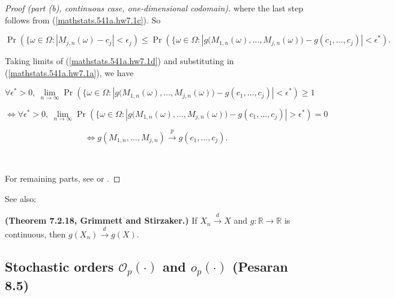 \begin{proof}[Proof (part (b), continuous case, one-dimensional codomain)]
where the last step follows from (\ref{mathstats.541a.hw7.1c}). So

\begin{equation}\label{mathstats.541a.hw7.1d}
\Pr(\{\omega \in \Omega : |M_{j,n}(\omega) - c_j| < \epsilon_j)  \leq \Pr(\{\omega \in \Omega : |g\big(M_{1,n}(\omega),\ldots,M_{j,n}(\omega) \big)- g(c_1, \ldots, c_j)| < \epsilon^*).
\end{equation}

Taking limits of (\ref{mathstats.541a.hw7.1d}) and substituting in (\ref{mathstats.541a.hw7.1a}), we have

%
%
%
%

\[
\forall \epsilon^* > 0, \ \lim_{n \to \infty} \Pr(\{\omega \in \Omega : |g\big(M_{1,n}(\omega),\ldots,M_{j,n}(\omega) \big)- g(c_1, \ldots, c_j)| < \epsilon^*) \geq 1
\]

\[
\iff \forall \epsilon^* > 0, \ \lim_{n \to \infty} \Pr(\{\omega \in \Omega : |g\big(M_{1,n}(\omega),\ldots,M_{j,n}(\omega) \big)- g(c_1, \ldots, c_j)| > \epsilon^*) = 0
\]

\[
\iff g(M_{1,n},\ldots,M_{j,n}) \xrightarrow{p} g(c_{1},\ldots,c_{j}).
\]


\

For remaining parts, see \citet{serfling1980} or \citet{rao1973linear}.\end{proof}

See also: 

\begin{theorem} \label{asym.thm.7.2.18} \textbf{(Theorem 7.2.18, Grimmett and Stirzaker.)} If \(X_n \xrightarrow{d} X\) and \(g: \mathbb{R} \to \mathbb{R}\) is continuous, then \(g(X_n) \xrightarrow{d} g(X)\). \end{theorem}

\subsection{Stochastic orders \(\mathcal{O}_p(\cdot)\) and \(o_p(\cdot)\) (Pesaran 8.5)}

